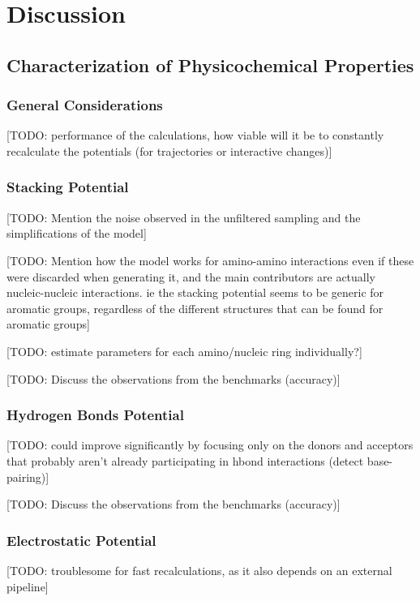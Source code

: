 \chapter{Discussion} %

\section{Characterization of Physicochemical Properties}
  \subsection{General Considerations}
    [TODO: performance of the calculations, how viable will it be to constantly recalculate the potentials (for trajectories or interactive changes)]

  \subsection{Stacking Potential}
    [TODO: Mention the noise observed in the unfiltered sampling and the simplifications of the model]

    [TODO: Mention how the model works for amino-amino interactions even if these were discarded when generating it, and the main contributors are actually nucleic-nucleic interactions. ie the stacking potential seems to be generic for aromatic groups, regardless of the different structures that can be found for aromatic groups]

    [TODO: estimate parameters for each amino/nucleic ring individually?]

    [TODO: Discuss the observations from the benchmarks (accuracy)]

  \subsection{Hydrogen Bonds Potential}
    [TODO: could improve significantly by focusing only on the donors and acceptors that probably aren't already participating in hbond interactions (detect base-pairing)]

    [TODO: Discuss the observations from the benchmarks (accuracy)]

  \subsection{Electrostatic Potential}
    [TODO: troublesome for fast recalculations, as it also depends on an external pipeline]

